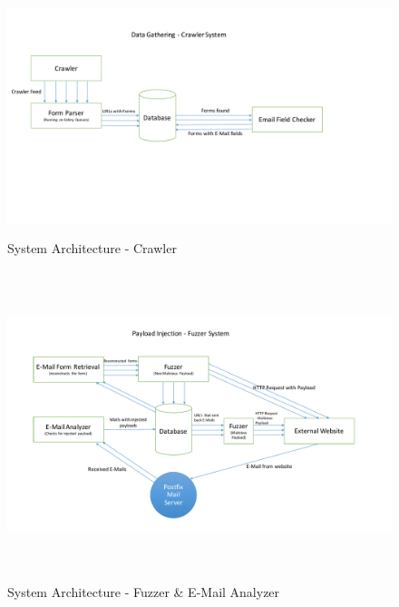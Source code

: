 \begin{figure}
	\centering
	\includegraphics[width=16cm, height=7cm]{System/crawler_design}
	\caption{System Architecture - Crawler}
	\label{fig:crawler}
\end{figure}


\begin{figure}
	\centering
	\includegraphics[width=16cm, height=9cm]{System/fuzzer_design}
	\caption{System Architecture - Fuzzer {\&} E-Mail Analyzer}
	\label{fig:fuzzer}
\end{figure}

